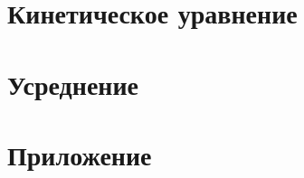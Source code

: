 




\section{Кинетическое уравнение}





\newpage
\section{Усреднение}


\newpage



\newpage
\section{Приложение}


\newpage


